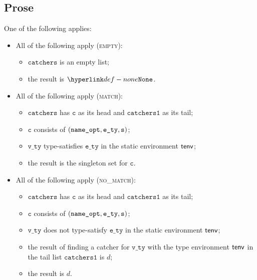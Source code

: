 \documentclass{book}
\newcommand\vc[0]{\texttt{c}}
\newcommand\catchers[0]{\texttt{catchers}}
\newcommand\catchersone[0]{\texttt{catchers1}}
\newcommand\ety[0]{\texttt{e\_ty}}
\newcommand\vvty[0]{\texttt{v\_ty}}
\begin{document}
\subsection{Prose}
One of the following applies:
\begin{itemize}
  \item All of the following apply (\textsc{empty}):
  \begin{itemize}
    \item $\catchers$ is an empty list;
    \item the result is $\None$.
  \end{itemize}

  \item All of the following apply (\textsc{match}):
  \begin{itemize}
    \item $\catchers$ has $\vc$ as its head and $\catchersone$ as its tail;
    \item $\vc$ consists of $(\nameopt, \ety, \vs)$;
    \item $\vvty$ type-satisfies $\ety$ in the static environment $\textsf{tenv}$;
    \item the result is the singleton set for $\vc$.
  \end{itemize}

  \item All of the following apply (\textsc{no\_match}):
  \begin{itemize}
    \item $\catchers$ has $\vc$ as its head and $\catchersone$ as its tail;
    \item $\vc$ consists of $(\nameopt, \ety, \vs)$;
    \item $\vvty$ does not type-satisfy $\ety$ in the static environment $\textsf{tenv}$;
    \item the result of finding a catcher for $\vvty$ with the type environment $\textsf{tenv}$ in the tail list $\catchersone$
    is $d$;
    \item the result is $d$.
  \end{itemize}
\end{itemize}

\end{document}
